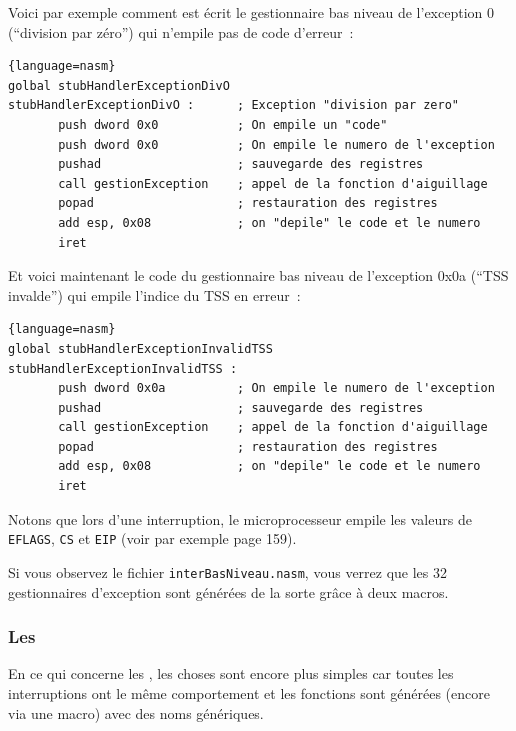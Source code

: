    Voici par exemple comment est écrit le gestionnaire bas niveau de
l'exception 0 (``division par zéro'') qui n'empile pas de code
d'erreur~:

\begin{lstlisting}{language=nasm}
golbal stubHandlerExceptionDivO
stubHandlerExceptionDivO :      ; Exception "division par zero"
       push dword 0x0           ; On empile un "code"
       push dword 0x0           ; On empile le numero de l'exception
       pushad                   ; sauvegarde des registres
       call gestionException    ; appel de la fonction d'aiguillage
       popad                    ; restauration des registres
       add esp, 0x08            ; on "depile" le code et le numero
       iret
\end{lstlisting}

   Et voici maintenant le code du gestionnaire bas niveau de
l'exception 0x0a (``TSS invalde'') qui empile l'indice du TSS en
erreur~:

\begin{lstlisting}{language=nasm}
global stubHandlerExceptionInvalidTSS
stubHandlerExceptionInvalidTSS :
       push dword 0x0a          ; On empile le numero de l'exception
       pushad                   ; sauvegarde des registres
       call gestionException    ; appel de la fonction d'aiguillage
       popad                    ; restauration des registres
       add esp, 0x08            ; on "depile" le code et le numero
       iret
\end{lstlisting}

   Notons que lors d'une interruption, le microprocesseur empile les
valeurs de {\tt EFLAGS}, {\tt CS} et {\tt EIP} (voir par exemple
\cite{intel386pru1986} page 159).

   Si vous observez le fichier \lstinline!interBasNiveau.nasm!, vous
verrez que les 32 gestionnaires d'exception sont générées de la sorte
grâce à deux macros.

%
\subsubsection{Les \irq}

   En ce qui concerne les \irq, les choses sont encore plus simples
car toutes les interruptions ont le même comportement et les fonctions
sont générées (encore via une macro) avec des noms génériques.


